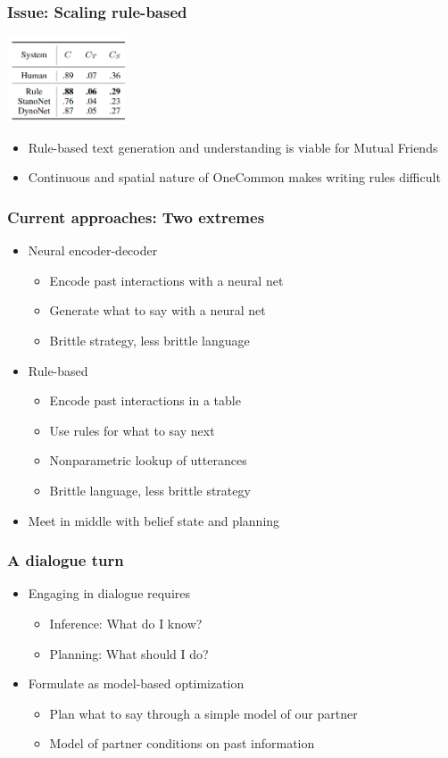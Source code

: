 \documentclass{beamer}
\begin{document}
\begin{frame}
\frametitle{Issue: Scaling rule-based}
\centering
\includegraphics[height=1in]{img/mf-res.png}
\begin{itemize}
\item Rule-based text generation and understanding is viable for Mutual Friends
\item Continuous and spatial nature of OneCommon makes writing rules difficult
\end{itemize}
\end{frame}

\begin{frame}
\frametitle{Current approaches: Two extremes}
\begin{itemize}
\item Neural encoder-decoder
    \begin{itemize}
    \item Encode past interactions with a neural net
    \item Generate what to say with a neural net
    \item Brittle strategy, less brittle language
    \end{itemize}
\item Rule-based
    \begin{itemize}
    \item Encode past interactions in a table
    \item Use rules for what to say next
    \item Nonparametric lookup of utterances
    \item Brittle language, less brittle strategy
    \end{itemize}
\item Meet in middle with belief state and planning
\end{itemize}
\end{frame}


\begin{frame}
\frametitle{A dialogue turn}
\begin{itemize}
\item Engaging in dialogue requires
    \begin{itemize}
    \item Inference: What do I know?
    \item Planning: What should I do?
    \end{itemize}
\item Formulate as model-based optimization
    \begin{itemize}
    \item Plan what to say through a simple model of our partner
    \item Model of partner conditions on past information
    \end{itemize}
\end{itemize}
\end{frame}
\end{document}
